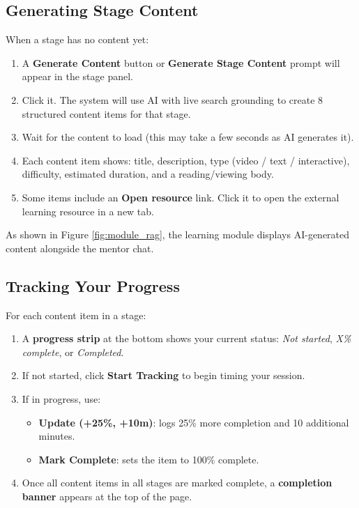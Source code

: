\documentclass{FastFyp}
\begin{document}
\subsection{Generating Stage Content}
When a stage has no content yet:
\begin{enumerate}
    \item A \textbf{Generate Content} button or \textbf{Generate Stage Content} prompt will appear in the stage panel.
    \item Click it. The system will use AI with live search grounding to create 8 structured content items for that stage.
    \item Wait for the content to load (this may take a few seconds as AI generates it).
    \item Each content item shows: title, description, type (video / text / interactive), difficulty, estimated duration, and a reading/viewing body.
    \item Some items include an \textbf{Open resource} link. Click it to open the external learning resource in a new tab.
\end{enumerate}

As shown in Figure \ref{fig:module_rag}, the learning module displays AI-generated content alongside the mentor chat.

\subsection{Tracking Your Progress}
For each content item in a stage:
\begin{enumerate}
    \item A \textbf{progress strip} at the bottom shows your current status: \textit{Not started}, \textit{X\% complete}, or \textit{Completed}.
    \item If not started, click \textbf{Start Tracking} to begin timing your session.
    \item If in progress, use:
        \begin{itemize}
            \item \textbf{Update (+25\%, +10m)}: logs 25\% more completion and 10 additional minutes.
            \item \textbf{Mark Complete}: sets the item to 100\% complete.
        \end{itemize}
    \item Once all content items in all stages are marked complete, a \textbf{completion banner} appears at the top of the page.
\end{enumerate}
\end{document}

